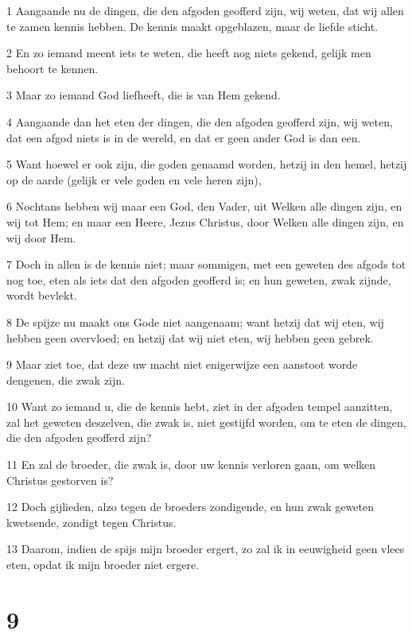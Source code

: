 \par 1 Aangaande nu de dingen, die den afgoden geofferd zijn, wij weten, dat wij allen te zamen kennis hebben. De kennis maakt opgeblazen, maar de liefde sticht.
\par 2 En zo iemand meent iets te weten, die heeft nog niets gekend, gelijk men behoort te kennen.
\par 3 Maar zo iemand God liefheeft, die is van Hem gekend.
\par 4 Aangaande dan het eten der dingen, die den afgoden geofferd zijn, wij weten, dat een afgod niets is in de wereld, en dat er geen ander God is dan een.
\par 5 Want hoewel er ook zijn, die goden genaamd worden, hetzij in den hemel, hetzij op de aarde (gelijk er vele goden en vele heren zijn),
\par 6 Nochtans hebben wij maar een God, den Vader, uit Welken alle dingen zijn, en wij tot Hem; en maar een Heere, Jezus Christus, door Welken alle dingen zijn, en wij door Hem.
\par 7 Doch in allen is de kennis niet; maar sommigen, met een geweten des afgods tot nog toe, eten als iets dat den afgoden geofferd is; en hun geweten, zwak zijnde, wordt bevlekt.
\par 8 De spijze nu maakt ons Gode niet aangenaam; want hetzij dat wij eten, wij hebben geen overvloed; en hetzij dat wij niet eten, wij hebben geen gebrek.
\par 9 Maar ziet toe, dat deze uw macht niet enigerwijze een aanstoot worde dengenen, die zwak zijn.
\par 10 Want zo iemand u, die de kennis hebt, ziet in der afgoden tempel aanzitten, zal het geweten deszelven, die zwak is, niet gestijfd worden, om te eten de dingen, die den afgoden geofferd zijn?
\par 11 En zal de broeder, die zwak is, door uw kennis verloren gaan, om welken Christus gestorven is?
\par 12 Doch gijlieden, alzo tegen de broeders zondigende, en hun zwak geweten kwetsende, zondigt tegen Christus.
\par 13 Daarom, indien de spijs mijn broeder ergert, zo zal ik in eeuwigheid geen vlees eten, opdat ik mijn broeder niet ergere.

\chapter{9}

